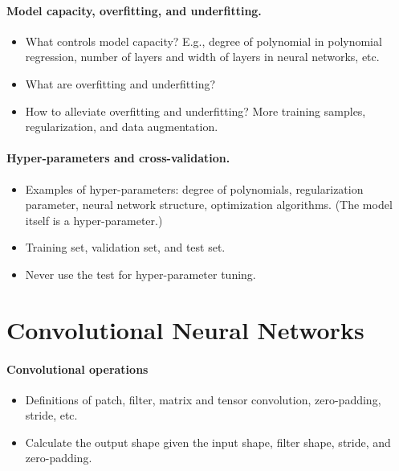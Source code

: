 \documentclass[11pt]{article}
\numberwithin{equation}{section}
\begin{document}
\paragraph{Model capacity, overfitting, and underfitting.}

\begin{itemize}
	\item
	What controls model capacity? E.g., degree of polynomial in polynomial regression, number of layers and width of layers in neural networks, etc.
	\item
	What are overfitting and underfitting?
	\item
	How to alleviate overfitting and underfitting?
	More training samples, regularization, and data augmentation.
\end{itemize}



\paragraph{Hyper-parameters and cross-validation.}

\begin{itemize}
	\item
	Examples of hyper-parameters:
	degree of polynomials, regularization parameter, neural network structure, optimization algorithms.
	(The model itself is a hyper-parameter.)
	\item
	Training set, validation set, and test set.
	\item
	Never use the test for hyper-parameter tuning.
\end{itemize}



\section{Convolutional Neural Networks}


\paragraph{Convolutional operations}

\begin{itemize}
	\item
	Definitions of patch, filter, matrix and tensor convolution, zero-padding, stride, etc.
	\item
	Calculate the output shape given the input shape, filter shape, stride, and zero-padding.
\end{itemize}
\end{document}
